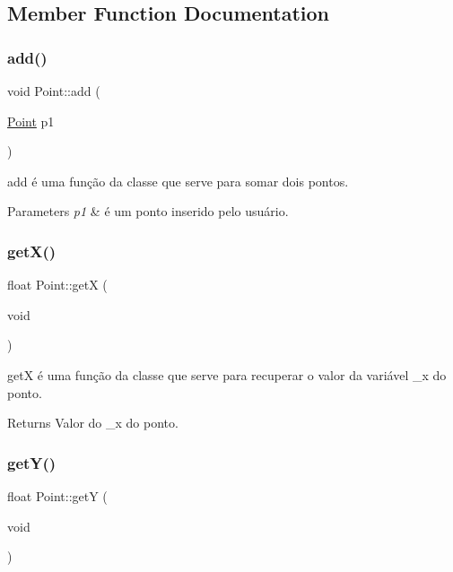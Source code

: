 \subsection{Member Function Documentation}
\mbox{\label{class_point_a6bcf8fd2524ecc4d5b6c1dc942d541a5}} 
\subsubsection{\texorpdfstring{add()}{add()}}
{\footnotesize\ttfamily void Point\+::add (\begin{DoxyParamCaption}\item[{\mbox{\hyperlink{class_point}{Point}}}]{p1 }\end{DoxyParamCaption})}



add é uma função da classe que serve para somar dois pontos. 


\begin{DoxyParams}{Parameters}
{\em p1} & é um ponto inserido pelo usuário. \\
\hline
\end{DoxyParams}
\mbox{\label{class_point_a9aa94b8fd07296e64d304ef3750db113}} 
\subsubsection{\texorpdfstring{get\+X()}{getX()}}
{\footnotesize\ttfamily float Point\+::getX (\begin{DoxyParamCaption}\item[{void}]{ }\end{DoxyParamCaption})}



getX é uma função da classe que serve para recuperar o valor da variável \+\_\+x do ponto. 

\begin{DoxyReturn}{Returns}
Valor do \+\_\+x do ponto. 
\end{DoxyReturn}
\mbox{\label{class_point_a2444daa96871c89614510bc4bfcd19ce}} 
\subsubsection{\texorpdfstring{get\+Y()}{getY()}}
{\footnotesize\ttfamily float Point\+::getY (\begin{DoxyParamCaption}\item[{void}]{ }\end{DoxyParamCaption})}



